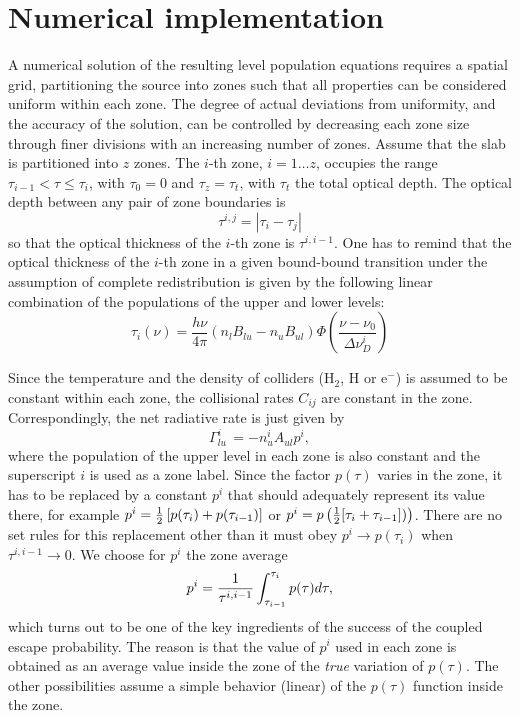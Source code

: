 \documentclass[12pt]{article}
\def\half     {\hbox{$1\over2$}}
\def\t(#1){\tau^{#1}}
\begin{document}
\section{Numerical implementation}
A numerical solution of the resulting level population equations requires a
spatial grid, partitioning the source into zones such that all properties can
be considered uniform within each zone. The degree of actual deviations from
uniformity, and the accuracy of the solution, can be controlled by decreasing
each zone size through finer divisions with an increasing number of zones.
Assume that the slab is partitioned into $z$ zones. The $i$-th zone, $i = 1
\dots z$, occupies the range $\tau_{i-1} < \tau \le \tau_{i}$, with $\tau_0=0$
and $\tau_z=\tau_t$, with $\tau_t$ the total optical depth. The optical depth
between any pair of zone boundaries is
\begin{equation}
\label{eq:tij}
    \t(i,j) = |\tau_i - \tau_j|
\end{equation}
so that the optical thickness of the $i$-th zone is $\t(i,i - 1)$.
One has to remind that the optical thickness of the $i$-th zone in a
given bound-bound transition under the assumption of complete redistribution
is given by the following linear combination
of the populations of the upper and lower levels:
\begin{equation}
\tau_i(\nu) = \frac{h \nu}{4\pi}
\left( n_l B_{lu} - n_u B_{ul} \right)
\Phi \left( \frac{\nu-\nu_0}{\Delta \nu_D^i} \right)
\end{equation}

Since the temperature and the density of colliders (H$_2$, H or e$^-$) is
assumed to be constant within each zone, the collisional rates $C_{ij}$ are
constant in the zone. Correspondingly, the net radiative rate is just given by
\begin{equation}
\label{eq:rate}
\Gamma_{lu}^i\,= -n_u^i A_{ul} p^i,
\end{equation}
where the population of the upper level in each zone is also constant and
the superscript $i$ is used as a zone label. Since the factor $p(\tau)$ varies
in the zone, it has to be replaced by a constant $p^i$ that should adequately
represent its value there, for example $p^i = \half\left[p(\tau_{i}) +
p(\tau_{i-1})\right]$ or $p^i = p\left(\half[\tau_{i} +\tau_{i-1}])\right)$.
There are no set rules for this replacement other than it must obey $p^i \to
p(\tau_{i})$ when $\t(i,i-1) \to 0$. We choose for $p^i$ the zone average
\begin{equation}
\label{eq:avg}
      p^i = {1\over\t(i,i-1)}\int_{\tau_{i-1}}^{\tau_i} p(\tau)d\tau,
\end{equation}
which turns out to be one of the key ingredients of the success of
the coupled escape probability. The reason is that the value of $p^i$ used
in each zone is obtained as an average value inside the zone of the \emph{true}
variation of $p(\tau)$. The other possibilities assume a simple behavior (linear)
of the $p(\tau)$ function inside the zone.
\end{document}

